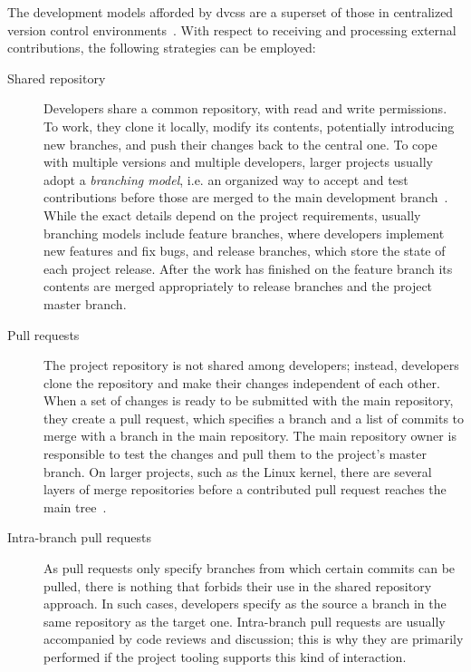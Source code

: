 \documentclass{sig-alternate}
\begin{document}
The development models afforded by {\sc dvcs}s are a superset of 
those in centralized version control environments~\cite{Shiha12,Bird09}. 
With respect to receiving and processing external contributions,
the following strategies can be employed:

\begin{description}

  \item[Shared repository] Developers share a common repository, with read and
    write permissions. To work, they clone it locally, modify its contents,
    potentially introducing new branches, and push their changes back to the
    central one. To cope with multiple versions and multiple developers, larger
    projects usually adopt a {\em branching model}, i.e. an organized way to
    accept and test contributions before those are merged to the main
    development branch~\cite{Bird12}. While the exact details depend on the
    project requirements, usually branching models include feature branches,
    where developers implement new features and fix bugs, and release branches,
    which store the state of each project release. After the work has finished
    on the feature branch its contents are merged appropriately to release
    branches and the project master branch.

  \item[Pull requests] The project repository is not shared among developers;
    instead, developers clone the repository and make their changes independent
    of each other. When a set of changes is ready to be submitted with the main
    repository, they create a pull request, which specifies a branch and a list
    of commits to merge with a branch in the main repository. The main
    repository owner is responsible to test the changes and pull them to the
    project's master branch. On larger projects, such as the Linux kernel,
    there are several layers of merge repositories before a contributed 
    pull request reaches the main tree~\cite{Cornf10}.

  \item[Intra-branch pull requests] As pull requests only specify branches from
    which certain commits can be pulled, there is nothing that forbids their use
    in the shared repository approach. In such cases, developers specify as the
    source a branch in the same repository as the target one.
    Intra-branch pull requests are usually accompanied by code reviews and
    discussion; this is why they are primarily performed if the project tooling
    supports this kind of interaction.

\end{description}
\end{document}
